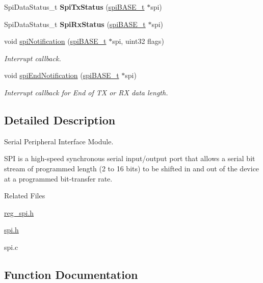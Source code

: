 \begin{DoxyCompactItemize}
Spi\+Data\+Status\+\_\+t {\bfseries Spi\+Tx\+Status} (\mbox{\hyperlink{reg__spi_8h_af46e8a85339f9acf2cc93f22b3a0d1d7}{spi\+B\+A\+S\+E\+\_\+t}} $\ast$spi)
\item 
\mbox{\label{group__SPI_ga58c934e364bdc3c7c91728da28372a7a}} 
Spi\+Data\+Status\+\_\+t {\bfseries Spi\+Rx\+Status} (\mbox{\hyperlink{reg__spi_8h_af46e8a85339f9acf2cc93f22b3a0d1d7}{spi\+B\+A\+S\+E\+\_\+t}} $\ast$spi)
\item 
void \mbox{\hyperlink{group__SPI_ga18e042a1628b90799aebaaf3876db589}{spi\+Notification}} (\mbox{\hyperlink{reg__spi_8h_af46e8a85339f9acf2cc93f22b3a0d1d7}{spi\+B\+A\+S\+E\+\_\+t}} $\ast$spi, uint32 flags)
\begin{DoxyCompactList}\small\item\em Interrupt callback. \end{DoxyCompactList}\item 
void \mbox{\hyperlink{group__SPI_ga139a2bd5549f796f0e41bc9b334bab2c}{spi\+End\+Notification}} (\mbox{\hyperlink{reg__spi_8h_af46e8a85339f9acf2cc93f22b3a0d1d7}{spi\+B\+A\+S\+E\+\_\+t}} $\ast$spi)
\begin{DoxyCompactList}\small\item\em Interrupt callback for End of TX or RX data length. \end{DoxyCompactList}\end{DoxyCompactItemize}


\subsection{Detailed Description}
Serial Peripheral Interface Module. 

S\+PI is a high-\/speed synchronous serial input/output port that allows a serial bit stream of programmed length (2 to 16 bits) to be shifted in and out of the device at a programmed bit-\/transfer rate.

Related Files
\begin{DoxyItemize}
\item \mbox{\hyperlink{reg__spi_8h}{reg\+\_\+spi.\+h}}
\item \mbox{\hyperlink{spi_8h}{spi.\+h}}
\item spi.\+c 
\end{DoxyItemize}

\subsection{Function Documentation}
\mbox{\label{group__SPI_ga139a2bd5549f796f0e41bc9b334bab2c}} 
